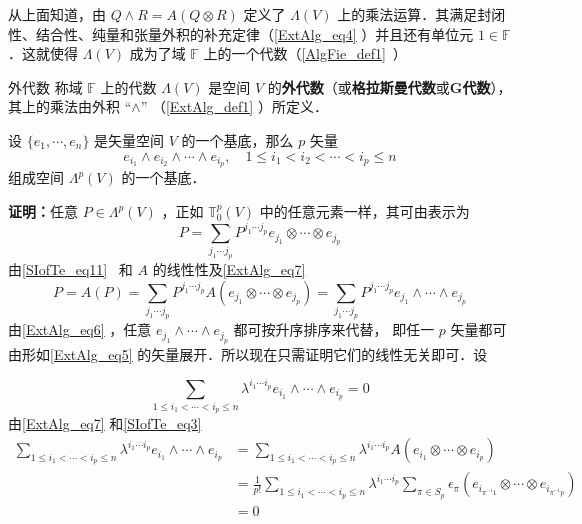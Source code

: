 从上面知道，由 $Q \wedge R=A(Q\otimes R)$ 定义了 $\Lambda(V)$ 上的乘法运算．其满足封闭性、结合性、纯量和张量外积的补充定律（\autoref{ExtAlg_eq4} ）并且还有单位元 $1\in\mathbb F$．这就使得 $\Lambda(V)$ 成为了域 $\mathbb F$ 上的一个代数（\autoref{AlgFie_def1}~）
\begin{definition}{外代数}
称域 $\mathbb F$ 上的代数 $\Lambda(V)$ 是空间 $V$ 的\textbf{外代数}（或\textbf{格拉斯曼代数}或\textbf{G代数}），其上的乘法由外积 “$\wedge$” （\autoref{ExtAlg_def1} ）所定义．
\end{definition}
\begin{theorem}{}\label{ExtAlg_the1}
设 $\{e_1,\cdots,e_n\}$ 是矢量空间 $V$ 的一个基底，那么 $p$ 矢量
\begin{equation}\label{ExtAlg_eq5}
e_{i_1}\wedge e_{i_2}\wedge\cdots\wedge e_{i_p},\quad 1\leq i_1<i_2<\cdots<i_p\leq n
\end{equation}
组成空间 $\Lambda^p(V)$ 的一个基底．
\end{theorem}
\textbf{证明：}任意 $P\in\Lambda^p(V)$ ，正如 $\mathbb T_0^p(V)$ 中的任意元素一样，其可由表示为
\begin{equation}
P=\sum_{j_1\cdots j_p}P^{j_1\cdots j_p}e_{j_1}\otimes\cdots\otimes e_{j_p}
\end{equation}
由\autoref{SIofTe_eq11}~ 和 $A$ 的线性性及\autoref{ExtAlg_eq7} 
\begin{equation}
P=A(P)=\sum_{j_1\cdots j_p}P^{j_1\cdots j_p}A(e_{j_1}\otimes\cdots\otimes e_{j_p})=\sum_{j_1\cdots j_p}P^{j_1\cdots j_p}e_{j_1}\wedge\cdots\wedge e_{j_p}
\end{equation}
由\autoref{ExtAlg_eq6} ，任意 $e_{j_1}\wedge\cdots\wedge e_{j_p}$ 都可按升序排序来代替， 即任一 $p$ 矢量都可由形如\autoref{ExtAlg_eq5} 的矢量展开．所以现在只需证明它们的线性无关即可．设


\begin{equation}
\sum_{1\leq i_1<\cdots<i_p\leq n} \lambda^{i_1\cdots i_p} e_{i_1}\wedge\cdots\wedge e_{i_p}=0
\end{equation}
由\autoref{ExtAlg_eq7} 和\autoref{SIofTe_eq3}~
\begin{equation}\label{ExtAlg_eq9}
\begin{aligned}
\sum_{1\leq i_1<\cdots<i_p\leq n} \lambda^{i_1\cdots i_p} e_{i_1}\wedge\cdots\wedge e_{i_p}&=\sum_{1\leq i_1<\cdots<i_p\leq n} \lambda^{i_1\cdots i_p} A(e_{i_1}\otimes\cdots\otimes e_{i_p})\\
&=\frac{1}{p!}\sum_{1\leq i_1<\cdots<i_p\leq n}\lambda^{i_1\cdots i_p}\sum_{\pi\in S_p}\epsilon_\pi(e_{i_{\pi^{-1} 1}}\otimes\cdots\otimes e_{i_{\pi^{-1} p}})\\
&=0
\end{aligned}
\end{equation}

